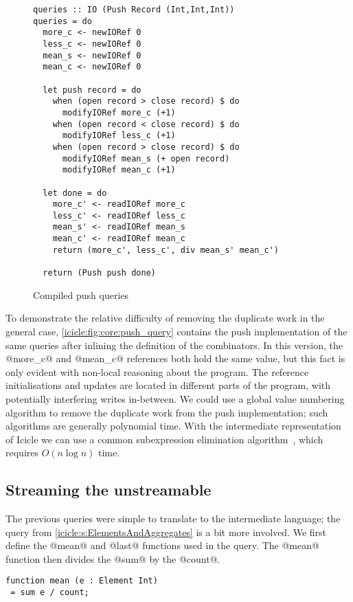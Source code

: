 \begin{figure}
\begin{lstlisting}
queries :: IO (Push Record (Int,Int,Int))
queries = do
  more_c <- newIORef 0
  less_c <- newIORef 0
  mean_s <- newIORef 0
  mean_c <- newIORef 0

  let push record = do
    when (open record > close record) $ do
      modifyIORef more_c (+1)
    when (open record < close record) $ do
      modifyIORef less_c (+1)
    when (open record > close record) $ do
      modifyIORef mean_s (+ open record)
      modifyIORef mean_c (+1)

  let done = do
    more_c' <- readIORef more_c
    less_c' <- readIORef less_c
    mean_s' <- readIORef mean_s
    mean_c' <- readIORef mean_c
    return (more_c', less_c', div mean_s' mean_c')
        
  return (Push push done)
\end{lstlisting}
\caption{Compiled push queries}
\label{icicle:fig:core:push_query}
\end{figure}

To demonstrate the relative difficulty of removing the duplicate work in the general case, \autoref{icicle:fig:core:push_query} contains the push implementation of the same queries after inlining the definition of the combinators.
In this version, the @more_c@ and @mean_c@ references both hold the same value, but this fact is only evident with non-local reasoning about the program.
The reference initialisations and updates are located in different parts of the program, with potentially interfering writes in-between.
We could use a global value numbering~\citep{gulwani2004polynomial} algorithm to remove the duplicate work from the push implementation; such algorithms are generally polynomial time.
With the intermediate representation of Icicle we can use a common subexpression elimination algorithm~\cite{chitil1997common}, which requires $O(n \log n)$ time.

\subsection{Streaming the unstreamable}

The previous queries were simple to translate to the intermediate language; the query from \autoref{icicle:s:ElementsAndAggregates} is a bit more involved.
We first define the @mean@ and @last@ functions used in the query.
The @mean@ function then divides the @sum@ by the @count@.
\begin{lstlisting}
function mean (e : Element Int)
 = sum e / count;
\end{lstlisting}

